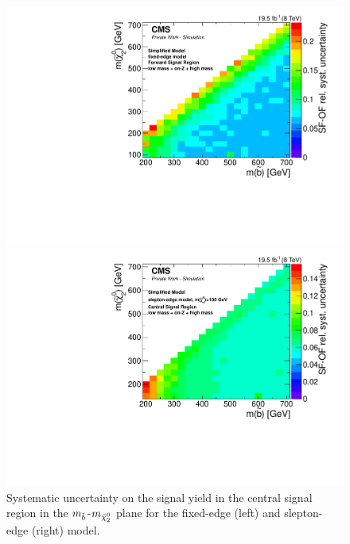 \begin{figure}[htbp]
\centering
\begin{minipage}[t]{0.49\textwidth}
  \includegraphics[width=\textwidth]{plots/limits/T6bblledge_70_GeV_Edge_Endcap_syst_err.pdf}
\end{minipage}
\begin{minipage}[t]{0.49\textwidth}
\includegraphics[width=\textwidth]{plots/limits/T6bbllslepton_m_n_1_100_Barrel_syst_err_Reweighted.pdf}
\end{minipage}
\caption{Systematic uncertainty on the signal yield in the central signal region in the $m_{\tilde{b}}$-$m_{{\tilde{\chi}^0_2}}$ plane for the fixed-edge (left) and slepton-edge (right) model.}
\label{fig:sys}
\end{figure}
